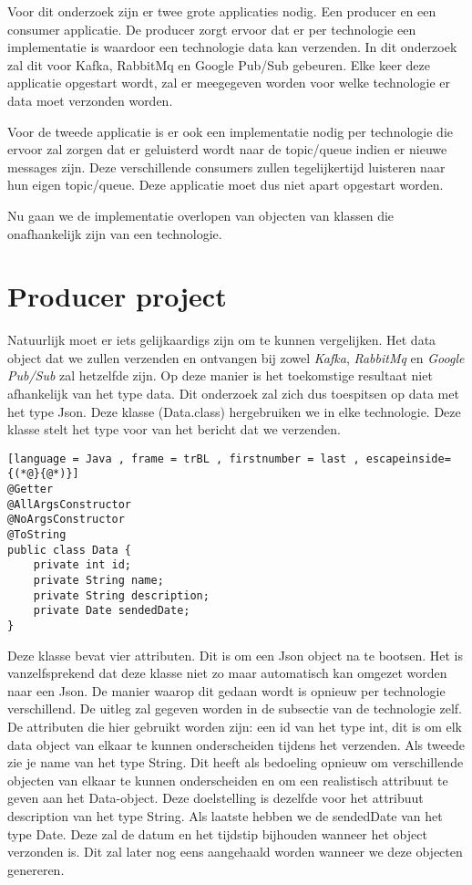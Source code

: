 Voor dit onderzoek zijn er twee grote applicaties nodig. Een producer en een consumer applicatie. De producer zorgt ervoor dat er per technologie een implementatie is waardoor een technologie data kan verzenden. In dit onderzoek zal dit voor Kafka, RabbitMq en Google Pub/Sub gebeuren. Elke keer deze applicatie opgestart wordt, zal er meegegeven worden voor welke technologie er data moet verzonden worden.

Voor de tweede applicatie is er ook een implementatie nodig per technologie die ervoor zal zorgen dat er geluisterd wordt naar de topic/queue indien er nieuwe messages zijn. Deze verschillende consumers zullen tegelijkertijd luisteren naar hun eigen topic/queue. Deze applicatie moet dus niet apart opgestart worden.

Nu gaan we de implementatie overlopen van objecten van klassen die onafhankelijk zijn van een technologie.

\section{Producer project}
Natuurlijk moet er iets gelijkaardigs zijn om te kunnen vergelijken. Het data object dat we zullen verzenden en ontvangen bij zowel \emph{Kafka}, \emph{RabbitMq} en \emph{Google Pub/Sub} zal hetzelfde zijn. Op deze manier is het toekomstige resultaat niet afhankelijk van het type data. Dit onderzoek zal zich dus toespitsen op data met het type Json. Deze klasse (Data.class) hergebruiken we in elke technologie. Deze klasse stelt het type voor van het bericht dat we verzenden.
\begin{lstlisting}[language = Java , frame = trBL , firstnumber = last , escapeinside={(*@}{@*)}]
@Getter
@AllArgsConstructor
@NoArgsConstructor
@ToString
public class Data {
    private int id;
    private String name;
    private String description;
    private Date sendedDate;
}
\end{lstlisting}

Deze klasse bevat vier attributen. Dit is om een Json object na te bootsen. Het is vanzelfsprekend dat deze klasse niet zo maar automatisch kan omgezet worden naar een Json. De manier waarop dit gedaan wordt is opnieuw per technologie verschillend. De uitleg zal gegeven worden in de subsectie van de technologie zelf. De attributen die hier gebruikt worden zijn: een id van het type int, dit is om elk data object van elkaar te kunnen onderscheiden tijdens het verzenden. Als tweede zie je name van het type String. Dit heeft als bedoeling opnieuw om verschillende objecten van elkaar te kunnen onderscheiden en om een realistisch attribuut te geven aan het Data-object. Deze doelstelling is dezelfde voor het attribuut description van het type String. Als laatste hebben we de sendedDate van het type Date. Deze zal de datum en het tijdstip bijhouden wanneer het object verzonden is. Dit zal later nog eens aangehaald worden wanneer we deze objecten genereren. 

